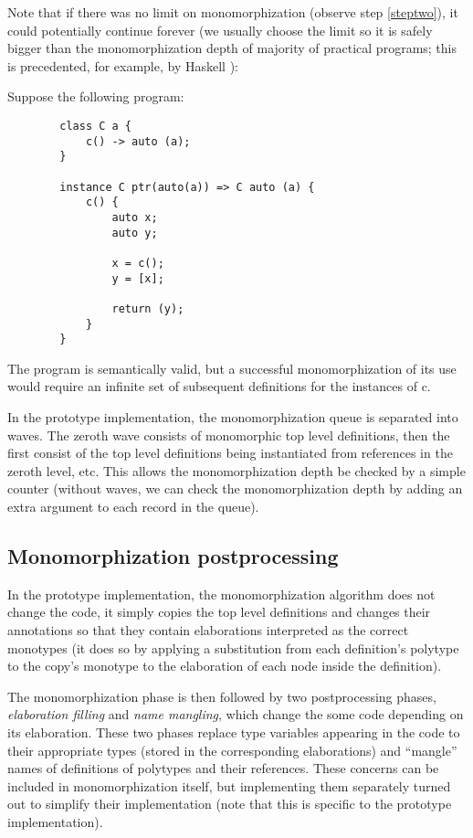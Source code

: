 Note that if there was no limit on monomorphization (observe step \ref{steptwo}), it could potentially continue forever (we usually choose the limit so it is safely bigger than the monomorphization depth of majority of practical programs; this is precedented, for example, by Haskell \cite{haskell2010}):

\begin{ex}
    Suppose the following program:

    \begin{lstlisting}
        class C a {
            c() -> auto (a);
        }

        instance C ptr(auto(a)) => C auto (a) {
            c() {
                auto x;
                auto y;

                x = c();
                y = [x];

                return (y);
            }
        }
    \end{lstlisting}

    The program is semantically valid, but a successful monomorphization of its use would require an infinite set of subsequent definitions for the instances of c.
\end{ex}

In the prototype implementation, the monomorphization queue is separated into waves. The zeroth wave consists of monomorphic top level definitions, then the first consist of the top level definitions being instantiated from references in the zeroth level, etc. This allows the monomorphization depth be checked by a simple counter (without waves, we can check the monomorphization depth by adding an extra argument to each record in the queue).

\subsection{Monomorphization postprocessing}

In the prototype implementation, the monomorphization algorithm does not change the code, it simply copies the top level definitions and changes their annotations so that they contain elaborations interpreted as the correct monotypes (it does so by applying a substitution from each definition's polytype to the copy's monotype to the elaboration of each node inside the definition).

The monomorphization phase is then followed by two postprocessing phases, \emph{elaboration filling} and \emph{name mangling}, which change the some code depending on its elaboration. These two phases replace type variables appearing in the code to their appropriate types (stored in the corresponding elaborations) and ``mangle'' names of definitions of polytypes and their references. These concerns can be included in monomorphization itself, but implementing them separately turned out to simplify their implementation (note that this is specific to the prototype implementation).

